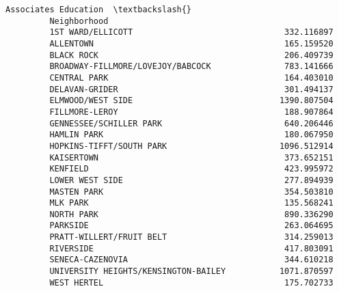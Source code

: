 \documentclass[11pt]{article}
\begin{document}
\begin{Verbatim}[commandchars=\\\{\}]
                                               Associates Education  \textbackslash{}
         Neighborhood                                                 
         1ST WARD/ELLICOTT                               332.116897   
         ALLENTOWN                                       165.159520   
         BLACK ROCK                                      206.409739   
         BROADWAY-FILLMORE/LOVEJOY/BABCOCK               783.141666   
         CENTRAL PARK                                    164.403010   
         DELAVAN-GRIDER                                  301.494137   
         ELMWOOD/WEST SIDE                              1390.807504   
         FILLMORE-LEROY                                  188.907864   
         GENNESSEE/SCHILLER PARK                         640.206446   
         HAMLIN PARK                                     180.067950   
         HOPKINS-TIFFT/SOUTH PARK                       1096.512914   
         KAISERTOWN                                      373.652151   
         KENFIELD                                        423.995972   
         LOWER WEST SIDE                                 277.894939   
         MASTEN PARK                                     354.503810   
         MLK PARK                                        135.568241   
         NORTH PARK                                      890.336290   
         PARKSIDE                                        263.064695   
         PRATT-WILLERT/FRUIT BELT                        314.259013   
         RIVERSIDE                                       417.803091   
         SENECA-CAZENOVIA                                344.610218   
         UNIVERSITY HEIGHTS/KENSINGTON-BAILEY           1071.870597   
         WEST HERTEL                                     175.702733   
         

\end{Verbatim}
\end{document}
